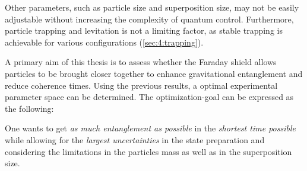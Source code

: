 Other parameters, such as particle size and superposition size, may not be easily adjustable without increasing the complexity of quantum control.
Furthermore, particle trapping and levitation is not a limiting factor, as stable trapping is achievable for various configurations (\cref{sec:4:trapping}).

A primary aim of this thesis is to assess whether the Faraday shield allows particles to be brought closer together to enhance gravitational entanglement and reduce coherence times. 
Using the previous results, a optimal experimental parameter space can be determined.
The optimization-goal can be expressed as the following:

One wants to get \textit{as much entanglement as possible} in the \textit{shortest time possible} while allowing for the \textit{largest uncertainties} in the state preparation and considering the limitations in the particles mass as well as in the superposition size.

